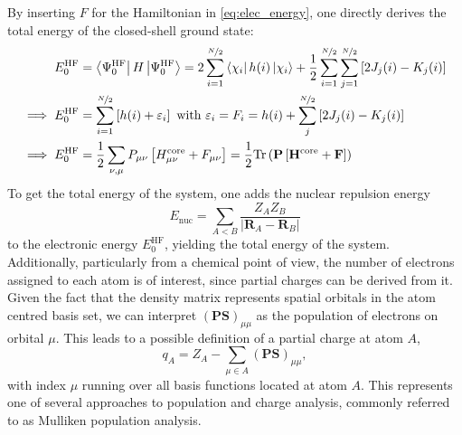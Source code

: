 By inserting $F$ for the Hamiltonian in \autoref{eq:elec_energy}, one directly derives the total energy of the closed-shell ground state: 
\begin{subequations}
\begin{align}
    E^\text{HF}_0 &= \bra{\Psi^\text{HF}_0} H \ket{\Psi^\text{HF}_0} = 2\sum_{i=1}^{\nicefrac{N}{2}} \bra{\chi_i} h(i) \ket{\chi_i}
    + \frac{1}{2}\sum_{i=1}^{\nicefrac{N}{2}}\sum_{j=1}^{\nicefrac{N}{2}} \left[ 2 J_j(i) - K_j(i) \right]\\
    \implies E^\text{HF}_0 &= \sum_{i=1}^{\nicefrac{N}{2}}\left[ h(i) + \varepsilon_i\right] \text{  with  } \varepsilon_i = F_i =  h(i) + \sum_{j}^{\nicefrac{N}{2}} \left[ 2 J_j(i) - K_j(i) \right]\\
    \implies E^\text{HF}_0 &= \frac{1}{2} \sum_{\nu, \mu} P_{\mu \nu} \left[ H_{\mu \nu}^\text{core} + F_{\mu \nu} \right] = \frac{1}{2} \text{Tr} \left( \mathbf{P} \left[ \mathbf{H}^\text{core} + \mathbf{F} \right] \right)
\end{align}
\end{subequations}
To get the total energy of the system, one adds the nuclear repulsion energy 
\begin{equation}
E_\text{nuc} = \sum_{A<B} \frac{Z_A Z_B}{|\mathbf{R}_A - \mathbf{R}_B|}
\end{equation}
to the electronic energy $E^\text{HF}_0$, yielding the total energy of the system. Additionally, particularly from a chemical point of view, the number of electrons assigned to each atom is of interest, since partial charges can be derived from it. Given the fact that the density matrix represents spatial orbitals in the atom centred basis set, we can interpret $\mathbf{(PS)}_{\mu \mu}$ as the population of electrons on orbital $\mu$. This leads to a possible definition of a partial charge at atom $A$,
\begin{equation}
    q_A = Z_A - \sum_{\mu \in A} \mathbf{(PS)}_{\mu \mu},
\end{equation}
with index $\mu$ running over all basis functions located at atom $A$. This represents one of several approaches to population and charge analysis, commonly referred to as Mulliken population analysis. \parencite{ref:mulliken1955electronic}
